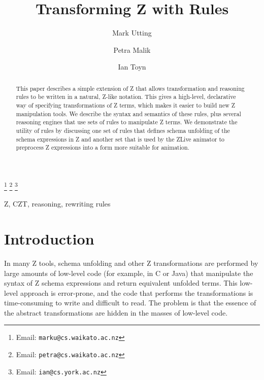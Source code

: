 \documentclass{entcs}
\begin{document}
\begin{frontmatter}
  \title{Transforming Z with Rules}
  \author{Mark Utting}
  \address{Department of Computer Science\\
    The University of Waikato\\
    Hamilton, New Zealand} 
  \author{Petra Malik}
  \address{Department of Computer Science\\
    The University of Waikato\\
    Hamilton, New Zealand} 
  \author{Ian Toyn}
  \address{Department of Computer Science\\
    The University of York\\
    Heslington, York, UK}
  \thanks[emailMark]{Email: \texttt{marku@cs.waikato.ac.nz}}
  \thanks[emailPetra]{Email: \texttt{petra@cs.waikato.ac.nz}}
  \thanks[emailIan]{Email: \texttt{ian@cs.york.ac.nz}}
\begin{abstract}
  This paper describes a simple extension of Z that allows transformation
  and reasoning rules to be written in a natural, Z-like notation.  This
  gives a high-level, declarative way of specifying transformations of Z
  terms, which makes it easier to build new Z manipulation tools.
  We describe the syntax and semantics of these rules, plus several reasoning
  engines that use sets of rules to manipulate Z terms.  We demonstrate the
  utility of rules by discussing one set of rules that defines schema
  unfolding of the schema expressions in Z and another set that is used by
  the ZLive animator to preprocess Z expressions into a form more suitable
  for animation.  
\end{abstract}
\begin{keyword}
  Z, CZT, reasoning, rewriting rules
\end{keyword}
\end{frontmatter}



\section{Introduction}

In many Z tools, schema unfolding and other Z transformations are performed
by large amounts of low-level code (for example, in C or Java) that
manipulate the syntax of Z schema expressions and return equivalent
unfolded terms.  This low-level approach is error-prone, and the code that
performs the transformations is time-consuming to write and difficult to
read.  The problem is that the essence of the abstract transformations are
hidden in the masses of low-level code.
\end{document}
